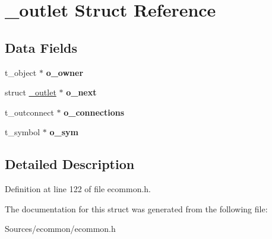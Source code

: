 \hypertarget{struct__outlet}{\section{\-\_\-outlet Struct Reference}
\label{struct__outlet}
}
\subsection*{Data Fields}
\begin{DoxyCompactItemize}
\item 
\hypertarget{struct__outlet_a7bdd65bdf46102a176835f19b3a2305b}{t\-\_\-object $\ast$ {\bfseries o\-\_\-owner}}\label{struct__outlet_a7bdd65bdf46102a176835f19b3a2305b}

\item 
\hypertarget{struct__outlet_ae26edec286a8bef11baa15ac0b9480e8}{struct \hyperlink{struct__outlet}{\-\_\-outlet} $\ast$ {\bfseries o\-\_\-next}}\label{struct__outlet_ae26edec286a8bef11baa15ac0b9480e8}

\item 
\hypertarget{struct__outlet_a18a291d6dfc4d4f5c380381138774af4}{t\-\_\-outconnect $\ast$ {\bfseries o\-\_\-connections}}\label{struct__outlet_a18a291d6dfc4d4f5c380381138774af4}

\item 
\hypertarget{struct__outlet_a305d36ab508da845dc8909a4b8570f9a}{t\-\_\-symbol $\ast$ {\bfseries o\-\_\-sym}}\label{struct__outlet_a305d36ab508da845dc8909a4b8570f9a}

\end{DoxyCompactItemize}


\subsection{Detailed Description}


Definition at line 122 of file ecommon.\-h.



The documentation for this struct was generated from the following file\-:\begin{DoxyCompactItemize}
\item 
Sources/ecommon/ecommon.\-h\end{DoxyCompactItemize}
